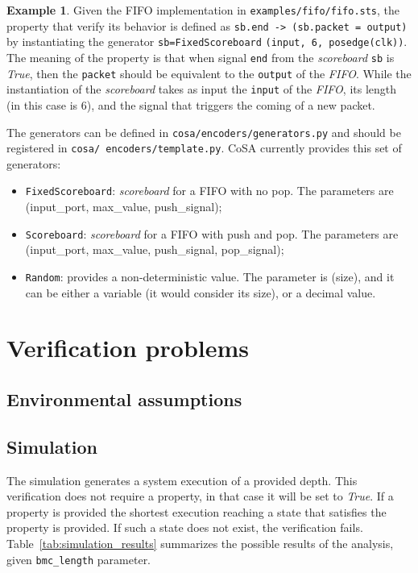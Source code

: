 \documentclass{article}
\theoremstyle{definition}
\newtheorem{example}{Example}[section]
\begin{document}
\begin{example}
  Given the FIFO implementation in \texttt{examples/fifo/fifo.sts},
  the property that verify its behavior is defined as \texttt{sb.end
    -> (sb.packet = output)} by instantiating the generator
  \texttt{sb=FixedScoreboard} \texttt{(input, 6, posedge(clk))}. The meaning of
  the property is that when signal \texttt{end} from the
  \emph{scoreboard} \texttt{sb} is \emph{True}, then the
  \texttt{packet} should be equivalent to the \texttt{output} of the
  \emph{FIFO}. While the instantiation of the \emph{scoreboard} takes
  as input the \texttt{input} of the \emph{FIFO}, its length (in this
  case is 6), and the signal that triggers the coming of a new packet.
\end{example}

The generators can be defined in \texttt{cosa/encoders/generators.py}
and should be registered in \texttt{cosa/
  encoders/template.py}. CoSA
currently provides this set of generators:

\begin{itemize}
\item \texttt{FixedScoreboard}: \emph{scoreboard} for a FIFO with no
  pop. The parameters are (input\_port, max\_value, push\_signal);
\item \texttt{Scoreboard}: \emph{scoreboard} for a FIFO with push and
  pop. The parameters are (input\_port, max\_value, push\_signal,
  pop\_signal);
\item \texttt{Random}: provides a non-deterministic value. The
  parameter is (size), and it can be either a variable (it would
  consider its size), or a decimal value.
\end{itemize}  

\section{Verification problems}
\label{sec:problem_definition}


\subsection{Environmental assumptions}



\subsection{Simulation}
The simulation generates a system execution of a provided depth. This
verification does not require a property, in that case it will be set
to \emph{True}. If a property is provided the shortest execution
reaching a state that satisfies the property is provided. If such a
state does not exist, the verification
fails. Table~\ref{tab:simulation_results} summarizes the possible
results of the analysis, given \texttt{bmc\_length} parameter.
\end{document}
